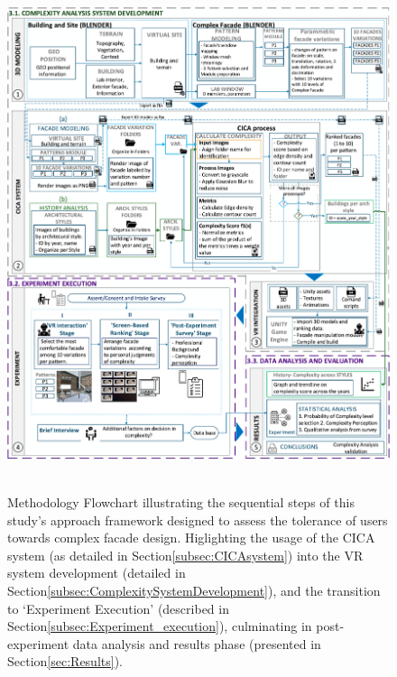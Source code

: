 \documentclass[final,5p,times]{elsarticle}%
\begin{document}
\begin{linenumbers}
    \begin{figure}[!htb]
        \centering
        \includegraphics[width=\linewidth]{Images/MethodologyFlowchart}~\caption{Methodology Flowchart illustrating the sequential steps of this study's approach framework designed to assess the tolerance of users towards complex facade design. Higlighting the usage of the CICA system (as detailed in Section\ref{subsec:CICAsystem}) into the VR system development (detailed in Section\ref{subsec:ComplexitySystemDevelopment}), and the transition to `Experiment Execution' (described in Section\ref{subsec:Experiment_execution}), culminating in post-experiment data analysis and results phase (presented in Section\ref{sec:Results}).}
          \label{fig:MethodologyFlowchart}
    \end{figure}


\end{linenumbers}
\end{document}
